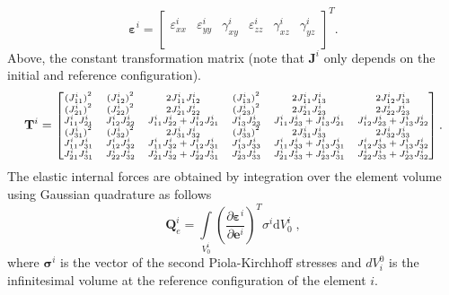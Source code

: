 \begin{equation} \label{eq:equ8}
{{\bm{\varepsilon }}^{i}}={{\left[ \begin{matrix}
		\varepsilon _{xx}^{i} & \varepsilon _{yy}^{i} & \gamma _{xy}^{i} & \varepsilon _{zz}^{i} & \gamma _{xz}^{i} & \gamma _{yz}^{i} \\
		\end{matrix} \right]}^{T}}.
\end{equation}
Above, the constant transformation matrix (note that ${{\mathbf{J}}^{i}}$ only depends on the initial and reference configuration).
\begin{equation} \label{eq:equ10}\scriptsize
{{\mathbf{T}}^{i}}=\left[ \begin{matrix}
{{(J_{11}^{i})}^{2}} & {{(J_{12}^{i})}^{2}} & 2J_{11}^{i}J_{12}^{i} & {{(J_{13}^{i})}^{2}} & 2J_{11}^{i}J_{13}^{i} & 2J_{12}^{i}J_{13}^{i}  \\
{{(J_{21}^{i})}^{2}} & {{(J_{22}^{i})}^{2}} & 2J_{21}^{i}J_{22}^{i} & {{(J_{23}^{i})}^{2}} & 2J_{21}^{i}J_{23}^{i} & 2J_{22}^{i}J_{23}^{i}  \\
J_{11}^{i}J_{21}^{i} & J_{12}^{i}J_{22}^{i} & J_{11}^{i}J_{22}^{i}+J_{12}^{i}J_{21}^{i} & J_{13}^{i}J_{23}^{i} & J_{11}^{i}J_{23}^{i}+J_{13}^{i}J_{21}^{i} & J_{12}^{i}J_{23}^{i}+J_{13}^{i}J_{22}^{i}  \\
{{(J_{31}^{i})}^{2}} & {{(J_{32}^{i})}^{2}} & 2J_{31}^{i}J_{32}^{i} & {{(J_{33}^{i})}^{2}} & 2J_{31}^{i}J_{33}^{i} & 2J_{32}^{i}J_{33}^{i}  \\
J_{11}^{i}J_{31}^{i} & J_{12}^{i}J_{32}^{i} & J_{11}^{i}J_{32}^{i}+J_{12}^{i}J_{31}^{i} & J_{13}^{i}J_{33}^{i} & J_{11}^{i}J_{33}^{i}+J_{13}^{i}J_{31}^{i} & J_{12}^{i}J_{33}^{i}+J_{13}^{i}J_{32}^{i}  \\
J_{21}^{i}J_{31}^{i} & J_{22}^{i}J_{32}^{i} & J_{21}^{i}J_{32}^{i}+J_{22}^{i}J_{31}^{i} & J_{23}^{i}J_{33}^{i} & J_{21}^{i}J_{33}^{i}+J_{23}^{i}J_{31}^{i} & J_{22}^{i}J_{33}^{i}+J_{23}^{i}J_{32}^{i}  \\
\end{matrix} \right]\normalsize.
\end{equation}
The elastic internal forces are obtained by integration over the element volume using Gaussian quadrature as follows
\begin{equation} \label{eq:equ11}
\mathbf{Q}_{e}^{i}=\int\limits_{V_0^i}{\left( \frac{\partial {{\mathbf{\varepsilon }}^{i}}}{\partial {{\mathbf{e}}^{i}}} \right)^T} \sigma ^i \text{d}{{V}_{0}^i}\;,
\end{equation}
where $\mathbf{\sigma}^{i}$ is the vector of the second Piola-Kirchhoff stresses and $dV_i^0$ is the infinitesimal volume at the reference configuration of the element $i$.  

